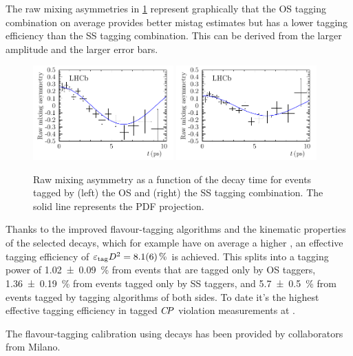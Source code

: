 The raw mixing asymmetries in
\cref{fig:dataanalysis:taggingcalibration:dsdcalibration:rawasymmetries}
represent graphically that the OS tagging combination on average provides
better mistag estimates but has a lower tagging efficiency than the SS tagging
combination. This can be derived from the larger amplitude and the larger
error bars.

\begin{figure}[htb]
\centering
\includegraphics[width=0.48\textwidth]{05-DataAnalysis/tikz/pdf/DsD_MixingAsym_OSComb.pdf}
\includegraphics[width=0.48\textwidth]{05-DataAnalysis/tikz/pdf/DsD_MixingAsym_SSComb.pdf}
\caption{Raw mixing asymmetry as a function of the \Bd decay time for events
tagged by (left) the OS and (right) the SS tagging combination. The solid line
represents the PDF projection.}
\label{fig:dataanalysis:taggingcalibration:dsdcalibration:rawasymmetries}
\end{figure}

Thanks to the improved flavour-tagging algorithms and the kinematic properties
of the selected \BdToDD decays, which for example have on average a higher
\pT, an effective tagging efficiency of $\etag D^2= \SI{8.1\pm0.6}{\percent}$
is achieved. This splits into a tagging power of \SI{1.02\pm0.09}{\percent}
from events that are tagged only by OS taggers, \SI{1.36\pm0.19}{\percent}
from events tagged only by SS taggers, and \SI{5.7\pm0.5}{\percent} from
events tagged by tagging algorithms of both sides. To date it's the highest
effective tagging efficiency in tagged $\CP$ violation measurements at \lhcb.

The flavour-tagging calibration using \BdToDsD decays has been provided by
collaborators from Milano.

